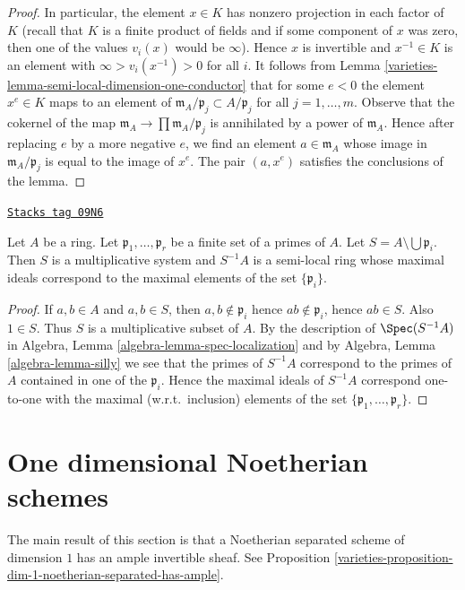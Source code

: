 \begin{proof}
\medskip\noindent
In particular, the element $x \in K$ has nonzero projection
in each factor of $K$ (recall that $K$ is a finite product of
fields and if some component of $x$ was zero, then one
of the values $v_i(x)$ would be $\infty$). Hence $x$ is
invertible and $x^{-1} \in K$ is an element with
$\infty > v_i(x^{-1}) > 0$ for all $i$. It follows from
Lemma \ref{varieties-lemma-semi-local-dimension-one-conductor} that
for some $e < 0$ the element $x^e \in K$ maps to an element of
$\mathfrak m_A/\mathfrak p_j \subset A/\mathfrak p_j$ for all
$j = 1, \ldots, m$. Observe that the cokernel of the map
$\mathfrak m_A \to \prod \mathfrak m_A/\mathfrak p_j$ is
annihilated by a power of $\mathfrak m_A$. Hence after replacing
$e$ by a more negative $e$, we find an element $a \in \mathfrak m_A$
whose image in $\mathfrak m_A/\mathfrak p_j$ is equal to
the image of $x^e$. The pair $(a, x^e)$ satisfies the
conclusions of the lemma.
\end{proof}

\begin{lemma}
\label{varieties-lemma-localization-semi-local}
\href{https://stacks.math.columbia.edu/tag/09N6}{\texttt{Stacks tag 09N6}}

Let $A$ be a ring. Let $\mathfrak p_1, \ldots, \mathfrak p_r$
be a finite set of a primes of $A$. Let
$S = A \setminus \bigcup \mathfrak p_i$. Then $S$ is a multiplicative
system and $S^{-1}A$ is a semi-local ring whose maximal ideals
correspond to the maximal elements of the set $\{\mathfrak p_i\}$.
\end{lemma}

\begin{proof}
If $a, b \in A$ and $a, b \in S$, then $a, b \not \in \mathfrak p_i$
hence $ab \not \in \mathfrak p_i$, hence $ab \in S$. Also $1 \in S$.
Thus $S$ is a multiplicative subset of $A$. By the description of
$\Spec(S^{-1}A)$ in
Algebra, Lemma \ref{algebra-lemma-spec-localization}
and by
Algebra, Lemma \ref{algebra-lemma-silly}
we see that the primes of $S^{-1}A$ correspond to the primes of
$A$ contained in one of the $\mathfrak p_i$.
Hence the maximal ideals of $S^{-1}A$ correspond one-to-one with the
maximal (w.r.t.\ inclusion) elements of the set
$\{\mathfrak p_1, \ldots, \mathfrak p_r\}$.
\end{proof}

\section{One dimensional Noetherian schemes}
\label{varieties-section-dimension-one}
The main result of this section is that a
Noetherian separated scheme of dimension $1$ has an
ample invertible sheaf. See
Proposition \ref{varieties-proposition-dim-1-noetherian-separated-has-ample}.

